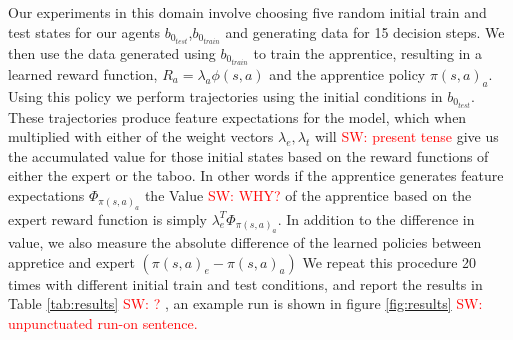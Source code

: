\documentclass[letterpaper]{article}
\newcommand{\sw}[1]{\textcolor{red}{SW: #1}}
\begin{document}
Our experiments in this domain involve choosing five random initial train and test states for our agents $b_{0_{test}}$,$b_{0_{train}}$ and generating data for 15 decision steps. We then use the data generated using $b_{0_{train}}$ to train the apprentice, resulting in a learned reward function, $R_a = \lambda_a\phi(s,a)$ and the apprentice policy $\pi(s,a)_a$. Using this policy we perform trajectories using the initial conditions in $b_{0_{test}}$. These trajectories produce feature expectations for the model, which when multiplied with either of the weight vectors $\lambda_e,\lambda_t$ will \sw{present tense} give us the accumulated value for those initial states based on the reward functions of either the expert or the taboo. In other words if the apprentice generates feature expectations $\Phi_{\pi(s,a)_a}$ the Value \sw{WHY?} of the apprentice based on the expert reward function is simply $\lambda_e^T\Phi_{\pi(s,a)_a}$. In addition to the difference in value, we also measure the absolute difference of the learned policies between appretice and expert $(\pi(s,a)_e - \pi(s,a)_a)$ We repeat this procedure 20 times with different initial train and test conditions, and report the results in Table \ref{tab:results} \sw{?} , an example run is shown in figure \ref{fig:results} \sw{unpunctuated run-on sentence.}
\end{document}
